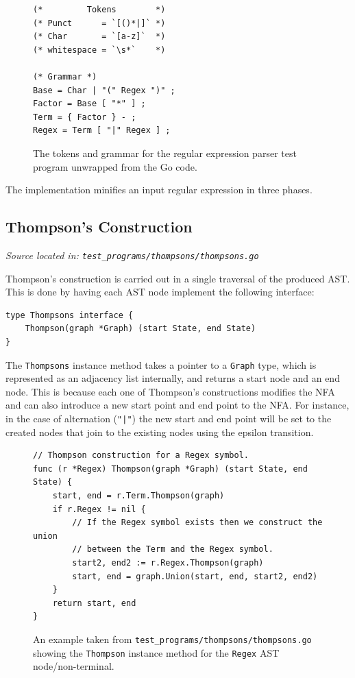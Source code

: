 \documentclass[]{full}
\theoremstyle{definition}
\begin{document}
\begin{figure}[H]
    \begin{verbatim}
(*         Tokens        *)
(* Punct      = `[()*|]` *)
(* Char       = `[a-z]`  *)
(* whitespace = `\s*`    *)

(* Grammar *)
Base = Char | "(" Regex ")" ;
Factor = Base [ "*" ] ;
Term = { Factor } - ;
Regex = Term [ "|" Regex ] ;
    \end{verbatim}
    \cprotect\caption{The tokens and grammar for the regular expression parser test program unwrapped from the Go code.}
\end{figure}

The implementation minifies an input regular expression in three phases.

\subsection{Thompson's Construction}
\cprotect\textit{Source located in: \verb|test_programs/thompsons/thompsons.go|}

Thompson's construction is carried out in a single traversal of the produced AST. This is done by having each AST node implement the following interface:

\begin{verbatim}
type Thompsons interface {
    Thompson(graph *Graph) (start State, end State)
}
\end{verbatim}

The \verb|Thompsons| instance method takes a pointer to a \verb|Graph| type, which is represented as an adjacency list internally, and returns a start node and an end node. This is because each one of Thompson's constructions modifies the NFA and can also introduce a new start point and end point to the NFA. For instance, in the case of alternation (\verb+"|"+) the new start and end point will be set to the created nodes that join to the existing nodes using the epsilon transition.

\begin{figure}[H]
    \begin{verbatim}
// Thompson construction for a Regex symbol.
func (r *Regex) Thompson(graph *Graph) (start State, end State) {
    start, end = r.Term.Thompson(graph)
    if r.Regex != nil {
        // If the Regex symbol exists then we construct the union
        // between the Term and the Regex symbol.
        start2, end2 := r.Regex.Thompson(graph)
        start, end = graph.Union(start, end, start2, end2)
    }
    return start, end
}
    \end{verbatim}
    \cprotect\caption{An example taken from \verb|test_programs/thompsons/thompsons.go| showing the \verb|Thompson| instance method for the \verb|Regex| AST node/non-terminal.}
\end{figure}
\end{document}
